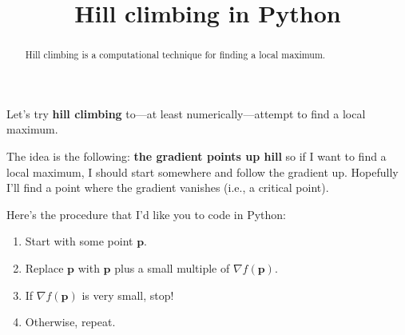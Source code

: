 \documentclass{ximera}
\title{Hill climbing in Python}
\begin{document}
\begin{abstract}
  Hill climbing is a computational technique for finding a local maximum.
\end{abstract}

Let's try \textbf{hill climbing} to---at least numerically---attempt
to find a local maximum.

The idea is the following: \textbf{the gradient points up hill} so if
I want to find a local maximum, I should start somewhere and follow
the gradient up.  Hopefully I'll find a point where the gradient
vanishes (i.e., a critical point).

\begin{question}
  Here's the procedure that I'd like you to code in Python:
  \begin{enumerate}
  \item Start with some point $\mathbf{p}$.
  \item Replace $\mathbf{p}$ with $\mathbf{p}$ plus a small multiple of $\nabla f(\mathbf{p})$.
  \item If $\nabla f(\mathbf{p})$ is very small, stop!
  \item Otherwise, repeat.
  \end{enumerate}



\end{question}
\end{document}
